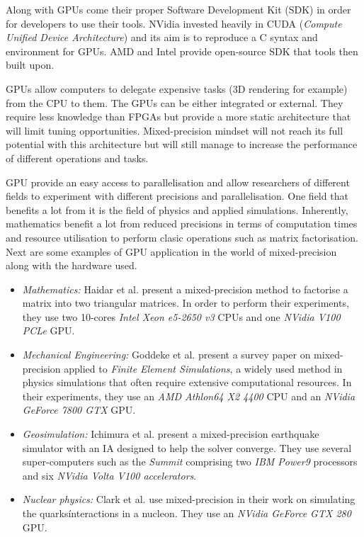 Along with GPUs come their proper Software Development Kit (SDK) in order for developers to use their tools. NVidia invested heavily in CUDA (\emph{Compute Unified Device Architecture}) \cite{CUDA} and its aim is to reproduce a C syntax and environment for GPUs. AMD and Intel provide open-source SDK that tools then built upon.

GPUs allow computers to delegate expensive tasks (3D rendering for example) from the CPU to them. The GPUs can be either integrated or external. They require less knowledge than FPGAs but provide a more static architecture that will limit tuning opportunities. Mixed-precision mindset will not reach its full potential with this architecture but will still manage to increase the performance of different operations and tasks.

GPU provide an easy access to parallelisation and allow researchers of different fields to experiment with different precisions and parallelisation. One field that benefits a lot from it is the field of physics and applied simulations. Inherently, mathematics benefit a lot from reduced precisions in terms of computation times and resource utilisation to perform clasic operations such as matrix factorisation. Next are some examples of GPU application in the world of mixed-precision along with the hardware used.

\begin{itemize}
  \item \emph{Mathematics:} Haidar et al. \cite{Haidar2018} present a mixed-precision method to factorise a matrix into two triangular matrices. In order to perform their experiments, they use two 10-cores \emph{Intel Xeon e5-2650 v3} CPUs and one \emph{NVidia V100 PCLe} GPU.
  \item \emph{Mechanical Engineering:} Goddeke et al. \cite{Goddeke2007} present a survey paper on mixed-precision applied to \emph{Finite Element Simulations}, a widely used method in physics simulations that often require extensive computational resources. In their experiments, they use an \emph{AMD Athlon64 X2 4400} CPU and an \emph{NVidia GeForce 7800 GTX} GPU.
  \item \emph{Geosimulation:} Ichimura et al. \cite{Ichimura2018} present a mixed-precision earthquake simulator with an IA designed to help the solver converge. They use several super-computers such as the \emph{Summit} comprising two \emph{IBM Power9} processors and six \emph{NVidia Volta V100 accelerators}.
  \item \emph{Nuclear physics:} Clark et al. \cite{Clark2010} use mixed-precision in their work on simulating the quarks\' interactions in a nucleon. They use an \emph{NVidia GeForce GTX 280} GPU.
\end{itemize}

